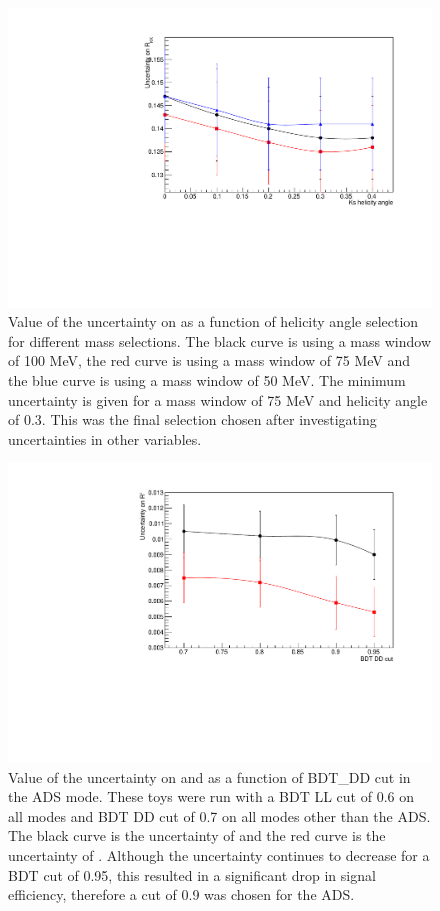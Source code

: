 \begin{figure}
\centering
\includegraphics[width=0.8\linewidth]{figures/selection/optimisation.pdf}
\caption{Value of the uncertainty on \Rkk as a function of \KS helicity angle selection for different \Kstar mass selections. The black curve is using a \Kstar mass window of 100 MeV, the red curve is using a \Kstar mass window of 75 MeV and the blue curve is using a \Kstar mass window of 50 MeV. The minimum uncertainty is given for a \Kstar mass window of 75 MeV and \KS helicity angle of 0.3. This was the final \Kstar selection chosen after investigating uncertainties in other variables.}
\label{optimisation}
\end{figure}

\begin{figure}
\centering
\includegraphics[width=0.8\linewidth]{figures/selection/ADSoptimisation.pdf}
\caption{Value of the uncertainty on \Rptwo and \Rmtwo as a function of BDT\_DD cut in the ADS mode. These toys were run with a BDT LL cut of 0.6 on all modes and BDT DD cut of 0.7 on all modes other than the ADS. The black curve is the uncertainty of \Rptwo and the red curve is the uncertainty of \Rmtwo. Although the uncertainty continues to decrease for a BDT cut of 0.95, this resulted in a significant drop in signal efficiency, therefore a cut of 0.9 was chosen for the ADS.}
\label{adsoptimisation}
\end{figure}

